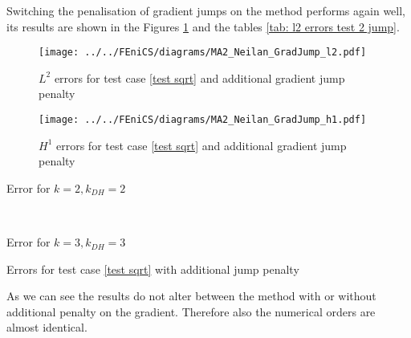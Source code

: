 Switching the penalisation of gradient jumps on the method performs again well, its results are shown in the Figures \ref{fig: l2 errors test 2 jump} and the tables \ref{tab: l2 errors test 2 jump}. 
\begin{figure}[H]
	\centering
	\texttt{[image: ../../FEniCS/diagrams/MA2\_Neilan\_GradJump\_l2.pdf]}
	\caption{$L^2$ errors for test case \ref{test sqrt}  and additional gradient jump penalty}
	\label{fig: l2 errors test 2 jump}
\end{figure}
\begin{figure}[H]
	\centering
	\texttt{[image: ../../FEniCS/diagrams/MA2\_Neilan\_GradJump\_h1.pdf]}
	\caption{$H^1$ errors for test case \ref{test sqrt}  and additional gradient jump penalty}
	\label{fig: h1 errors test 2 jump}
\end{figure}
\begin{table}[H]
	\begin{subtable}[b]{0.45\textwidth}
		\centering
		\pgfplotstabletypeset[
		columns={iterations, l2error, h1error,N},
		every row 0 column 0/.style={set content=init},
		]{\MATwoJumpdegTwoTwo}
		\caption{Error for $k=2, k_{DH}=2$}
	\end{subtable}
	~
	\begin{subtable}[b]{0.45\textwidth}
		\centering
		\pgfplotstabletypeset[columns={iterations, l2error, h1error,N},
		every row 0 column 0/.style={set content=init},
		]{\MATwoJumpdegThreeThree}
		\caption{Error for $k=3, k_{DH}=3$}
	\end{subtable}
	\caption{Errors for test case \ref{test sqrt} with additional jump penalty}
	\label{tab: l2 errors test 2 jump}
\end{table}

As we can see the results do not alter between the method with or without additional penalty on the gradient. Therefore also the numerical orders are almost identical.  

